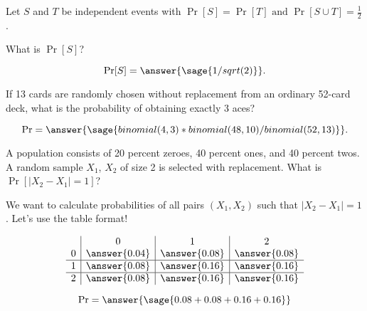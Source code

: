\documentclass{ximera}
\begin{document}
\begin{problem}
 Let $S$ and $T$ be independent events with $\Pr[S] = \Pr[T] \text{ and }\Pr[S \cup T] = \frac{1}{2}$.

What is $\Pr[S]$? 

\begin{prompt}
$$\Pr[S]=\answer{\sage{1/sqrt(2)}}.$$
\end{prompt}

\end{problem}

\begin{problem}
If 13 cards are randomly chosen without replacement from an ordinary 52-card deck, what is the probability of obtaining exactly 3 aces? 

\begin{prompt}
$$\Pr=\answer{\sage{binomial(4,3)*binomial(48,10)/binomial(52,13)}}.$$
\end{prompt}

\end{problem}

\begin{problem}
A population consists of 20 percent zeroes, 40 percent ones, and 40 percent twos. A random sample $X_1$, $X_2$ of size 2 is selected with replacement. What is $\Pr[|X_2-X_1|=1]$?
\begin{hint}
We want to calculate probabilities of all pairs $(X_1,X_2)$ such that $|X_2-X_1|=1$. Let's use the table format!
\end{hint}


\begin{prompt}
$$
\begin{array}{c|c|c|c}
  & 0 & 1 & 2 \\
0 &\answer{0.04} & \answer{0.08} & \answer{0.08} \\
\hline
1 &\answer{0.08} & \answer{0.16} & \answer{0.16} \\
\hline
2 &\answer{0.08} & \answer{0.16} & \answer{0.16} \\
\end{array}
$$

$$\Pr=\answer{\sage{0.08+0.08+0.16+0.16}}$$
\end{prompt}

\end{problem}
\end{document}
